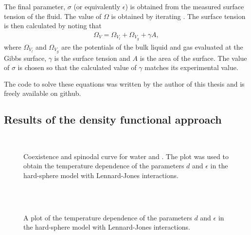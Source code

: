The final parameter, $\sigma$ (or equivalently $\epsilon$) is obtained from the measured surface tension of the fluid.
The value of $\Omega$ is obtained by iterating .  
The surface tension is then calculated by noting that
\begin{align}
  \Omega_V = \Omega_{V_l} + \Omega_{V_g} + \gamma A,
\end{align}
where $\Omega_{V_l}$ and $\Omega_{V_g}$ are the potentials of the bulk liquid and gas evaluated at the Gibbs surface,
$\gamma$ is the surface tension and $A$ is the area of the surface.
The value of $\sigma$ is chosen so that the calculated value of $\gamma$ matches its experimental value.


The code to solve these equations was written by the author of this thesis and is freely available on github\cite{NucleationCode}.

\subsection{Results of the density functional approach}\label{sec:nuc:DFT:results}


\begin{figure}
  \hspace*{-8mm}
  \\
  \hspace*{-8mm}
  \caption{Coexistence and spinodal curve for water and \pfp.
    The plot was used to obtain the temperature dependence of the parameters $d$ and $\epsilon$ 
    in the hard-sphere model with Lennard-Jones interactions.
  }
 \label{fig:nuc:coex}
\end{figure}

\begin{figure}
  \hspace*{-22mm}
  \\
  \hspace*{-22mm}
  \\
  \caption{
    A plot of the  temperature dependence of the parameters $d$ and $\epsilon$ 
    in the hard-sphere model with Lennard-Jones interactions.
  }
 \label{fig:nuc:params}
\end{figure}

